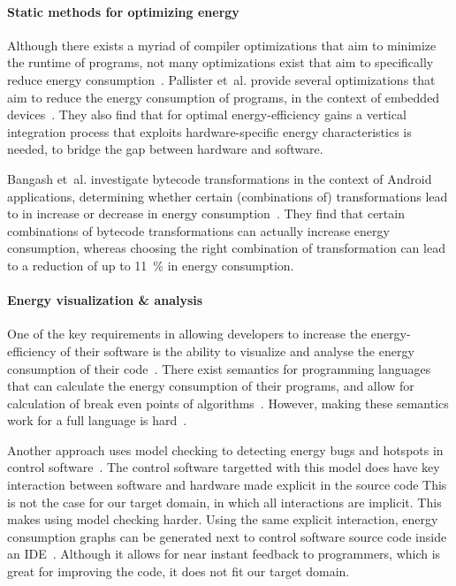 \documentclass[runningheads]{llncs}
\begin{document}
\paragraph{Static methods for optimizing energy}
Although there exists a myriad of compiler optimizations that aim to minimize the runtime of programs, not many optimizations exist that aim to specifically reduce energy consumption~\cite{Pallister2016exploring}.
Pallister et~al. provide several optimizations that aim to reduce the energy consumption of programs, in the context of embedded devices~\cite{pallister2015optimizing,pallister2013identifying}.
They also find that for optimal energy-efficiency gains a vertical integration process that exploits hardware-specific energy characteristics is needed, to bridge the gap between hardware and software.

Bangash et~al. investigate bytecode transformations in the context of Android applications, determining whether certain (combinations of) transformations lead to in increase or decrease in energy consumption~\cite{bangash2022black}.
They find that certain combinations of bytecode transformations can actually increase energy consumption, whereas choosing the right combination of transformation can lead to a reduction of up to \qty{11}{\percent} in energy consumption.

\paragraph{Energy visualization \& analysis}
One of the key requirements in allowing developers to increase the energy-efficiency of their software is the ability to visualize and analyse the energy consumption of their code~\cite{steen2023organizational}.
There exist semantics for programming languages that can calculate the energy consumption of their programs, and allow for calculation of break even points of algorithms~\cite{gastel2016using,gastel2017towards,gastel2016assessing}.
However, making these semantics work for a full language is hard~\cite{gastel2017towards}.

Another approach uses model checking to detecting energy bugs and hotspots in control software~\cite{gastel2018detecting}.
The control software targetted with this model does have key interaction between software and hardware made explicit in the source code This is not the case for our target domain, in which all interactions are implicit.
This makes using model checking harder.
Using the same explicit interaction, energy consumption graphs can be generated next to control software source code inside an IDE~\cite{klinik2020skylines}.
Although it allows for near instant feedback to programmers, which is great for improving the code, it does not fit our target domain.
\end{document}
